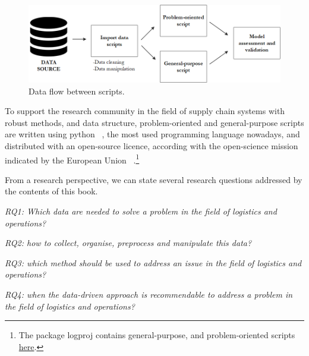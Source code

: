 \begin{figure}[hbt!]
\centering
\includegraphics[width=1\textwidth]{SectionIntroduction/dataDrivenDecisions_fig/fig_data_flow.png}
\captionsetup{type=figure}
\caption{Data flow between scripts.}
\label{fig_data_flow}
\end{figure}

To support the research community in the field of supply chain systems with robust methods, and data structure, problem-oriented and general-purpose scripts are written using python ~\cite{Lee2015}, the most used programming language nowadays, and distributed with an open-source licence, according with the open-science mission indicated by the European Union ~\cite{Parliament2019}.\footnote{The package logproj contains general-purpose, and problem-oriented scripts \href{https://github.com/aletuf93/logproj}{here}.}

From a research perspective, we can state several research questions addressed by the contents of this book.

\textit{RQ1: Which data are needed to solve a problem in the field of logistics and operations?}\bigskip

\textit{RQ2: how to collect, organise, preprocess and manipulate this data?}\bigskip

\textit{RQ3: which method should be used to address an issue in the field of logistics and operations?}\bigskip

\textit{RQ4:  when the data-driven approach is recommendable to address a problem in the field of logistics and operations?}\bigskip

